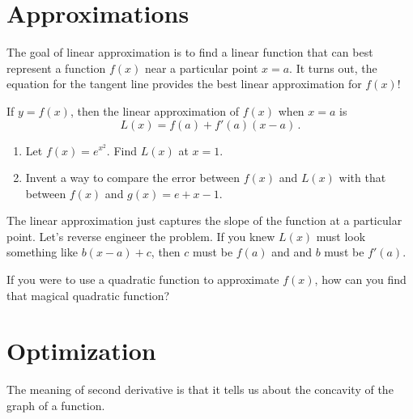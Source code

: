 \documentclass[12pt]{amsart}
\begin{document}
\newpage

\section*{Approximations}
The goal of linear approximation is to find a linear function that can best represent a function $f(x)$
near a particular point $x = a$.
It turns out, the equation for the tangent line provides the best linear approximation for $f(x)$!


If $y = f(x)$, then the linear approximation of $f(x)$ when $x = a$ is
\begin{equation*}
	L(x) = f(a) + f'(a)(x-a) \,.
\end{equation*}

\begin{question}
	\begin{enumerate}
		\item Let $f(x) = e^{x^2}$. Find $L(x)$ at $x = 1$.
		      \vspace{3cm}
		\item Invent a way to compare the error between $f(x)$ and $L(x)$ with that between $f(x)$ and $g(x) = e+ x-1$.
		      \vspace{3cm}
	\end{enumerate}


\end{question}

\newpage


The linear approximation just captures the slope of the function at a particular point.
Let's reverse engineer the problem. If you knew $L(x)$ must look something like $b(x-a) + c$, then $c$ must be $f(a)$ and and $b$ must be $f'(a)$.


If you were to use a quadratic function to approximate $f(x)$, how can you find that magical quadratic function?

\newpage






\section*{Optimization}

The meaning of second derivative is that it tells us about the concavity of the graph of a function.
\end{document}
